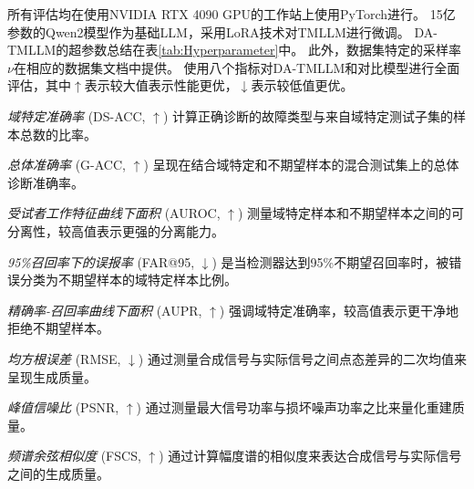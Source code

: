 \documentclass[UTF8,lettersize,journal]{IEEEtran}
\begin{document}
所有评估均在使用NVIDIA RTX 4090 GPU的工作站上使用PyTorch进行。
15亿参数的Qwen2\cite{QWEN}模型作为基础LLM，采用LoRA技术\cite{20231213775448}对TMLLM进行微调。
DA-TMLLM的超参数总结在表\ref{tab:Hyperparameter}中。
此外，数据集特定的采样率$\nu$在相应的数据集文档中提供。
使用八个指标对DA-TMLLM和对比模型进行全面评估，其中$\uparrow$表示较大值表示性能更优，$\downarrow$表示较低值更优。

\textit{域特定准确率} (DS-ACC, $\uparrow$) 计算正确诊断的故障类型与来自域特定测试子集的样本总数的比率。

\textit{总体准确率} (G-ACC, $\uparrow$) 呈现在结合域特定和不期望样本的混合测试集上的总体诊断准确率。

\textit{受试者工作特征曲线下面积} (AUROC, $\uparrow$) 测量域特定样本和不期望样本之间的可分离性，较高值表示更强的分离能力。

\textit{95\%召回率下的误报率} (FAR@95, $\downarrow$) 是当检测器达到95\%不期望召回率时，被错误分类为不期望样本的域特定样本比例。

\textit{精确率-召回率曲线下面积} (AUPR, $\uparrow$) 强调域特定准确率，较高值表示更干净地拒绝不期望样本。

\textit{均方根误差} (RMSE, $\downarrow$) 通过测量合成信号与实际信号之间点态差异的二次均值来呈现生成质量。

\textit{峰值信噪比} (PSNR, $\uparrow$) 通过测量最大信号功率与损坏噪声功率之比来量化重建质量。

\textit{频谱余弦相似度} (FSCS, $\uparrow$) 通过计算幅度谱的相似度来表达合成信号与实际信号之间的生成质量。
\end{document}

